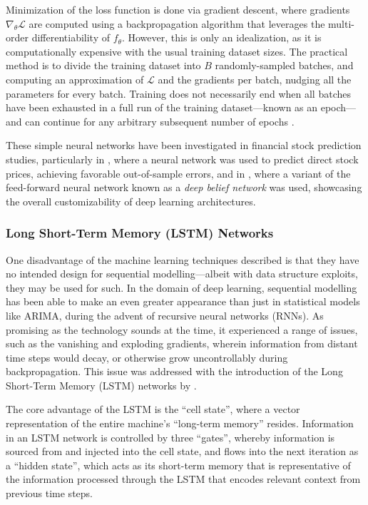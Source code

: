 \documentclass[stu,floatsintext]{apa7}
\begin{document}
Minimization of the loss function is done via gradient descent, where gradients $\nabla_{\theta}\mathcal{L}$ are computed using a backpropagation algorithm that leverages the multi-order differentiability of $f_\theta$. However, this is only an idealization, as it is computationally expensive with the usual training dataset sizes. The practical method is to divide the training dataset into $B$ randomly-sampled batches, and computing an approximation of $\mathcal L$ and the gradients per batch, nudging all the parameters for every batch. Training does not necessarily end when all batches have been exhausted in a full run of the training dataset—known as an epoch—and can continue for any arbitrary subsequent number of epochs \parencite{rumelhart1986backprop}.

These simple neural networks have been investigated in financial stock prediction studies, particularly in \textcite{deoliveira2013applying}, where a neural network was used to predict direct stock prices, achieving favorable out-of-sample errors, and in \textcite{shen2015forecasting}, where a variant of the feed-forward neural network known as a \textit{deep belief network} was used, showcasing the overall customizability of deep learning architectures.

\subsubsection{Long Short-Term Memory (LSTM) Networks}

One disadvantage of the machine learning techniques described is that they have no intended design for sequential modelling—albeit with data structure exploits, they may be used for such. In the domain of deep learning, sequential modelling has been able to make an even greater appearance than just in statistical models like ARIMA, during the advent of recursive neural networks (RNNs). As promising as the technology sounds at the time, it experienced a range of issues, such as the vanishing and exploding gradients, wherein information from distant time steps would decay, or otherwise grow uncontrollably during backpropagation. This issue was addressed with the introduction of the Long Short-Term Memory (LSTM) networks by \textcite{hochreiter1997long}.

The core advantage of the LSTM is the ``cell state'', where a vector representation of the entire machine’s “long-term memory” resides. Information in an LSTM network is controlled by three “gates”, whereby information is sourced from and injected into the cell state, and flows into the next iteration as a “hidden state”, which acts as its short-term memory that is representative of the information processed through the LSTM that encodes relevant context from previous time steps.
\end{document}

